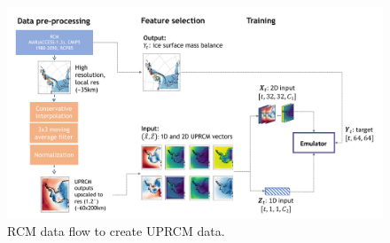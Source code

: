 \documentclass[a4paper,11pt,oneside]{report}
\begin{document}
\begin{figure}[!htb]
  \centering
  \includegraphics[width=\columnwidth]{images/data-flow.pdf}
  \caption []{\small RCM data flow to create UPRCM data.}
  \vspace{-3mm}
  \label{fig:training-data-flow}
\end{figure}
\end{document}
